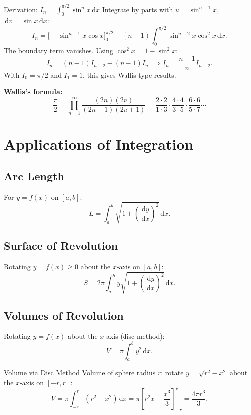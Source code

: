 \documentclass[12pt, a4paper]{book}
\newenvironment{keyresult}{%
  \begin{tcolorbox}[keystyle]%
}{%
  \end{tcolorbox}%
}
\newcommand{\dd}{\,\mathrm{d}}
\newcommand{\dx}{\,\mathrm{d}x}
\begin{document}
\begin{example}{Derivation: $I_n=\int_0^{\pi/2}\sin^n x\dx$}{}
Integrate by parts with $u=\sin^{n-1}x$, $\dd v=\sin x\dx$:
\[
I_n = \bigl[-\sin^{n-1}x\cos x\bigr]_0^{\pi/2}+(n-1)\int_0^{\pi/2}\sin^{n-2}x\cos^2 x\dx.
\]
The boundary term vanishes. Using $\cos^2 x=1-\sin^2 x$:
\[
I_n=(n-1)I_{n-2}-(n-1)I_n \implies I_n = \frac{n-1}{n}I_{n-2}.
\]
With $\displaystyle I_0=\pi/2$ and $\displaystyle I_1=1$, this gives Wallis-type results.
\end{example}

\begin{keyresult}
\textbf{Wallis's formula:}
\[
\frac{\pi}{2}=\prod_{n=1}^{\infty}\frac{(2n)(2n)}{(2n-1)(2n+1)}=\frac{2\cdot2}{1\cdot3}\cdot\frac{4\cdot4}{3\cdot5}\cdot\frac{6\cdot6}{5\cdot7}\cdots
\]
\end{keyresult}

\section{Applications of Integration}

\subsection{Arc Length}

For $\displaystyle y=f(x)$ on $\displaystyle [a,b]$:
\[
L = \int_a^b\sqrt{1+\left(\frac{\dd y}{\dx}\right)^2}\dx.
\]

\subsection{Surface of Revolution}

Rotating $\displaystyle y=f(x)\geq 0$ about the $\displaystyle x$-axis on $\displaystyle [a,b]$:
\[
S = 2\pi\int_a^b y\sqrt{1+\left(\frac{\dd y}{\dx}\right)^2}\dx.
\]

\subsection{Volumes of Revolution}

Rotating $\displaystyle y=f(x)$ about the $\displaystyle x$-axis (disc method):
\[
V = \pi\int_a^b y^2\dx.
\]

\begin{example}{Volume via Disc Method}{}
Volume of sphere radius $\displaystyle r$: rotate $\displaystyle y=\sqrt{r^2-x^2}$ about the $\displaystyle x$-axis on $\displaystyle [-r,r]$:
\[
V=\pi\int_{-r}^{r}(r^2-x^2)\dx=\pi\left[r^2x-\frac{x^3}{3}\right]_{-r}^{r}=\frac{4\pi r^3}{3}.
\]
\end{example}
\end{document}
